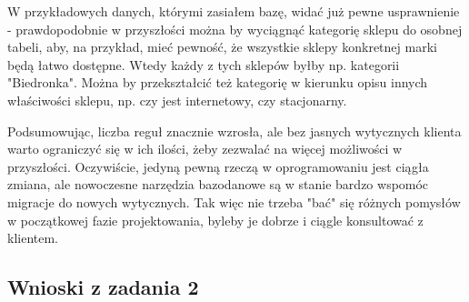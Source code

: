 \documentclass[a4paper,12pt]{article}
\begin{document}
W przykładowych danych, którymi zasiałem bazę, widać już pewne usprawnienie - prawdopodobnie w przyszłości można by wyciągnąć kategorię sklepu do osobnej tabeli, aby, na przykład, mieć pewność, że wszystkie sklepy konkretnej marki będą łatwo dostępne. Wtedy każdy z tych sklepów byłby np. kategorii "Biedronka". Można by przekształcić też kategorię w kierunku opisu innych właściwości sklepu, np. czy jest internetowy, czy stacjonarny.

Podsumowując, liczba reguł znacznie wzrosła, ale bez jasnych wytycznych klienta warto ograniczyć się w ich ilości, żeby zezwalać na więcej możliwości w przyszłości. Oczywiście, jedyną pewną rzeczą w oprogramowaniu jest ciągła zmiana, ale nowoczesne narzędzia bazodanowe są w stanie bardzo wspomóc migracje do nowych wytycznych.
Tak więc nie trzeba "bać" się różnych pomysłów w początkowej fazie projektowania, byleby je dobrze i ciągle konsultować z klientem.

\subsection{Wnioski z zadania 2}
\end{document}
